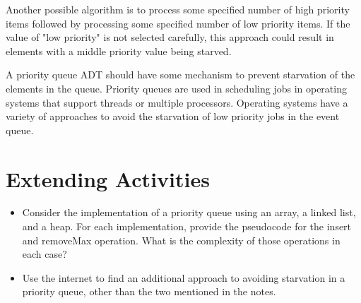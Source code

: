 Another possible algorithm is to process some specified number of high priority items followed by processing some specified number of  low priority items. If the value of "low priority" is not selected carefully, this approach could result in elements with a middle priority value being starved.

A priority queue ADT should have some mechanism to prevent starvation of the elements in the queue.  Priority queues are used in scheduling jobs in operating systems that support threads or multiple processors.   Operating systems have a variety of approaches to avoid the starvation of low priority jobs in the event queue.  

\section{Extending Activities}
\begin{itemize}
\item Consider the implementation of a priority queue using an array, a linked list,  and a heap.   For each implementation,  provide the pseudocode for the insert and removeMax operation.  What is the complexity of those operations in each case?
\item Use the internet to find an additional approach to avoiding starvation in a priority queue, other than the two mentioned in the notes.  

\end{itemize}




